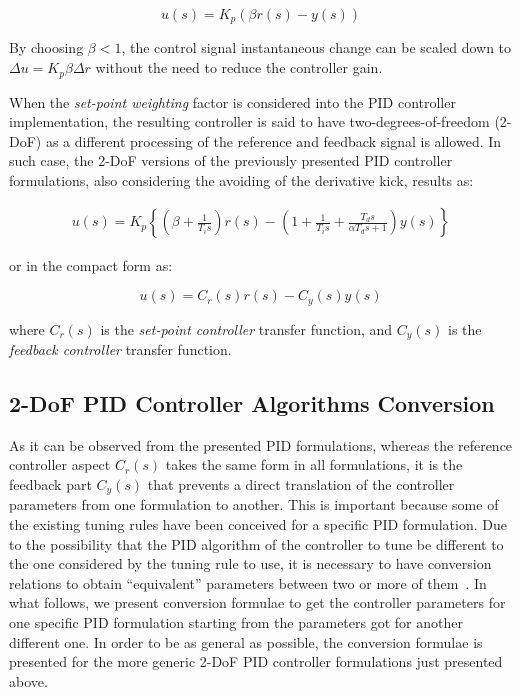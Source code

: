 \begin{equation}
u(s)=K_p(\beta r(s) - y(s))
\end{equation}

By choosing $\beta < 1$, the control signal instantaneous change can be scaled down to $\Delta u = K_p \beta \Delta r$  without the need to reduce the controller gain. 

When the \emph{set-point weighting} factor is considered into the PID controller implementation, the resulting controller is said to have two-degrees-of-freedom (2-DoF) as a different processing of the reference and feedback signal is allowed. In such case, the 2-DoF versions of the previously presented PID controller formulations, also considering the avoiding of the derivative kick, results as:

\begin{align}
    u(s)= K_p \left \{ \left(\beta + \frac{1}{T_i s}\right) r(s) - \left(1 + \frac{1}{T_i s} + \frac{T_d s}{\alpha T_d s+1}\right) y(s) \right \} \label{eq:103}
\end{align}

\noindent or in the compact form  as:

\begin{equation}
    u(s)=C_r(s) r(s) - C_y(s) y(s) \label{eq:104}
\end{equation}

\noindent where $C_r(s)$ is the \emph{set-point controller} transfer function, and $C_y(s)$ is the \emph{feedback controller} transfer function. \\


\subsection{2-DoF PID Controller Algorithms Conversion}
As it can be observed from the presented PID formulations, whereas the reference controller aspect $C_r(s)$ takes the same form in all formulations, it is the feedback part $C_y(s)$  that prevents a direct translation of the controller parameters from one formulation to another. This is important because some of the existing tuning rules have been conceived for a specific PID formulation. Due to the possibility that the PID algorithm of the controller to tune be different to the one considered by the tuning rule to use, it is necessary to have conversion relations to obtain ``equivalent'' parameters between two or more of them~\cite{alfaroetfa2012-2}. In what follows, we present conversion formulae to get the controller parameters for one specific PID formulation starting from the parameters got for another different one. In order to be as general as possible, the conversion formulae is presented for the more generic 2-DoF PID controller formulations just presented above.


